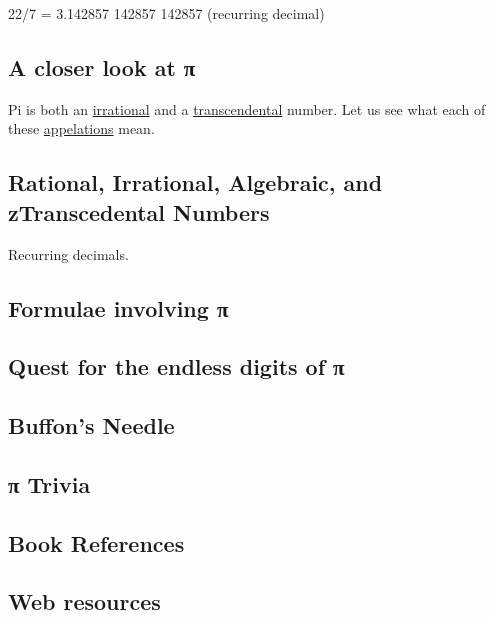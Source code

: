 \documentclass[
  a4paper,
]{article}
\begin{document}
22/7 = 3.142857 142857 142857 (recurring decimal)

\subsection{A closer look at π}\label{a-closer-look-at-ux3c0}

Pi is both an
\href{https://en.wikipedia.org/wiki/Irrational_number}{irrational} and a
\href{https://en.wikipedia.org/wiki/Transcendental_number}{transcendental}
number. Let us see what each of these
\href{https://www.merriam-webster.com/dictionary/appellation}{appelations}
mean.

\subsection{Rational, Irrational, Algebraic, and zTranscedental
Numbers}\label{rational-irrational-algebraic-and-ztranscedental-numbers}

Recurring decimals.

\subsection{Formulae involving π}\label{formulae-involving-ux3c0}

\subsection{Quest for the endless digits of
π}\label{quest-for-the-endless-digits-of-ux3c0}

\subsection{Buffon's Needle}\label{buffons-needle}

\subsection{π Trivia}\label{ux3c0-trivia}

\subsection{Book References}\label{book-references}

\subsection{Web resources}\label{web-resources}
\end{document}
